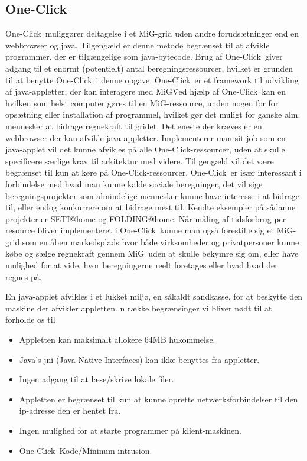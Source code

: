 \documentclass[pdf,draft,a4paper,10pt]{article}
\newcommand{\mig}{MiG}
\newcommand{\oc}{One-Click}
\begin{document}
\subsection{\oc}\label{applet}
\oc\ muliggører deltagelse i et \mig-grid uden andre forudsætninger end en webbrowser og java. Tilgengæld er denne metode begrænset til at afvikle programmer, der er tilgængelige som java-bytecode. Brug af \oc\ giver adgang til et enormt (potentielt) antal beregningsressourcer, hvilket er grunden til at benytte \oc\ i denne opgave.
\oc\ er et framework til udvikling af java-appletter, der kan interagere med \mig\. Ved hjælp af \oc\ kan en hvilken som helst computer gøres til en \mig-ressource, unden nogen for for opsætning eller installation af programmel, hvilket gør det muligt for ganske alm. mennesker at bidrage regnekraft til gridet. Det eneste der kræves er en webbrowser der kan afvikle java-appletter. Implementerer man sit job som en java-applet vil det kunne afvikles på alle \oc-ressourcer, uden at skulle specificere særlige krav til arkitektur med videre. Til gengæld vil det være begrænset til kun at køre på \oc-ressourcer. 
\oc\ er især interessant i forbindelse med hvad man kunne kalde sociale beregninger, det vil sige beregningsprojekter som almindelige mennesker kunne have interesse i at bidrage til, eller endog konkurrere om at bidrage mest til. Kendte eksempler på sådanne projekter er SETI@home og FOLDING@home. Når måling af tidsforbrug per resource bliver implementeret i \oc\ kunne man også  forestille sig et \mig-grid som en åben markedsplads hvor både virksomheder og privatpersoner kunne købe og sælge regnekraft gennem \mig\ uden at skulle bekymre sig om, eller have mulighed for at vide, hvor beregningerne reelt foretages eller hvad hvad der regnes på. 


En java-applet afvikles i et lukket miljø, en såkaldt sandkasse, for at beskytte den maskine der afvikler appletten. n række begrænsinger vi bliver nødt til at forholde os til
\begin{itemize}
	\item Appletten kan maksimalt allokere 64MB hukommelse.
	\item Java's jni (Java Native Interfaces) kan ikke benyttes fra appletter. 
	\item Ingen adgang til at læse/skrive lokale filer.
	\item Appletten er begrænset til kun at kunne oprette netværksforbindelser til den ip-adresse den er hentet fra.
	\item Ingen mulighed for at starte programmer på klient-maskinen.
	\item \oc\ Kode/Mininum intrusion.
\end{itemize}
\end{document}
